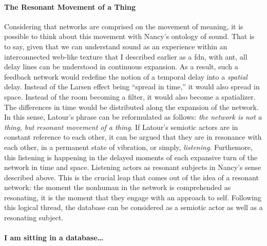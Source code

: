\paragraph{The Resonant Movement of a Thing}
Considering that networks are comprised on the movement of meaning, it is possible to think about this movement with Nancy's ontology of sound. That is to say, given that we can understand sound as an experience within an interconnected web-like texture that I described earlier as a \gls{fdn}, with \gls{ant}, all delay lines can be understood in continuous expansion. As a result, such a feedback network would redefine the notion of a temporal delay into a \textit{spatial} delay. Instead of the Larsen effect being ``spread in time,'' it would also spread in space. Instead of the room becoming a filter, it would also become a spatializer. The differences in time would be distributed along the expansion of the network. In this sense, Latour's phrase can be reformulated as follows: \textit{the network is not a thing, but resonant movement of a thing}. If Latour's semiotic actors are in constant reference to each other, it can be argued that they are in resonance with each other, in a permanent state of vibration, or simply, \textit{listening}. Furthemore, this listening is happening in the delayed moments of each expansive turn of the network in time and space. Listening actors as resonant subjects in Nancy's sense described above. This is the crucial leap that comes out of the idea of a resonant network: the moment the nonhuman in the network is comprehended as resonating, it is the moment that they engage with an approach to self. Following this logical thread, the database can be considered as a semiotic actor as well as a resonating subject. 

\paragraph{I am sitting in a database\dots}




